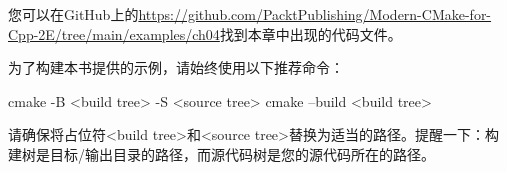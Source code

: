 
您可以在GitHub上的\url{https://github.com/PacktPublishing/Modern-CMake-for-Cpp-2E/tree/main/examples/ch04}找到本章中出现的代码文件。

为了构建本书提供的示例，请始终使用以下推荐命令：

\begin{shell}
cmake -B <build tree> -S <source tree>
cmake --build <build tree>
\end{shell}

请确保将占位符<build tree>和<source tree>替换为适当的路径。提醒一下：构建树是目标/输出目录的路径，而源代码树是您的源代码所在的路径。










